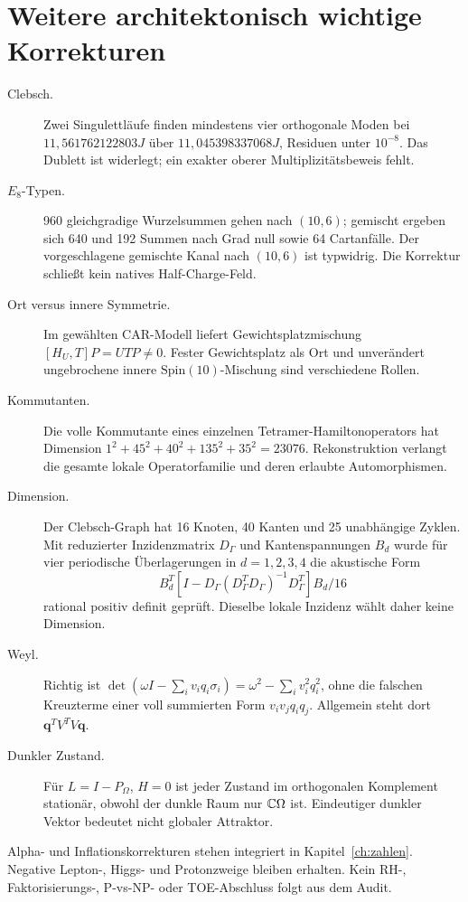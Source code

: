 \section{Weitere architektonisch wichtige Korrekturen}
\begin{description}
\item[Clebsch.] Zwei Singulettläufe finden mindestens vier orthogonale Moden bei $11{,}561762122803J$ über $11{,}045398337068J$, Residuen unter $10^{-8}$. Das Dublett ist widerlegt; ein exakter oberer Multiplizitätsbeweis fehlt.
\item[$E_8$-Typen.] 960 gleichgradige Wurzelsummen gehen nach $(10,6)$; gemischt ergeben sich 640 und 192 Summen nach Grad null sowie 64 Cartanfälle. Der vorgeschlagene gemischte Kanal nach $(10,6)$ ist typwidrig. Die Korrektur schließt kein natives Half-Charge-Feld.
\item[Ort versus innere Symmetrie.] Im gewählten CAR-Modell liefert Gewichtsplatzmischung $[H_U,T]P=UTP\ne0$. Fester Gewichtsplatz als Ort und unverändert ungebrochene innere $\mathrm{Spin}(10)$-Mischung sind verschiedene Rollen.
\item[Kommutanten.] Die volle Kommutante eines einzelnen Tetramer-Hamiltonoperators hat Dimension $1^2+45^2+40^2+135^2+35^2=23076$. Rekonstruktion verlangt die gesamte lokale Operatorfamilie und deren erlaubte Automorphismen.
\item[Dimension.] Der Clebsch-Graph hat 16 Knoten, 40 Kanten und 25 unabhängige Zyklen. Mit reduzierter Inzidenzmatrix $D_\Gamma$ und Kantenspannungen $B_d$ wurde für vier periodische Überlagerungen in $d=1,2,3,4$ die akustische Form
\[
B_d^T[I-D_\Gamma(D_\Gamma^TD_\Gamma)^{-1}D_\Gamma^T]B_d/16
\]
rational positiv definit geprüft. Dieselbe lokale Inzidenz wählt daher keine Dimension.
\item[Weyl.] Richtig ist $\det(\omega I-\sum_i v_iq_i\sigma_i)=\omega^2-\sum_i v_i^2q_i^2$, ohne die falschen Kreuzterme einer voll summierten Form $v_iv_jq_iq_j$. Allgemein steht dort $\mathbf q^TV^TV\mathbf q$.
\item[Dunkler Zustand.] Für $L=I-P_\Omega$, $H=0$ ist jeder Zustand im orthogonalen Komplement stationär, obwohl der dunkle Raum nur $\mathbb C\Omega$ ist. Eindeutiger dunkler Vektor bedeutet nicht globaler Attraktor.
\end{description}
Alpha- und Inflationskorrekturen stehen integriert in Kapitel~\ref{ch:zahlen}. Negative Lepton-, Higgs- und Protonzweige bleiben erhalten. Kein RH-, Faktorisierungs-, P-vs-NP- oder TOE-Abschluss folgt aus dem Audit.
